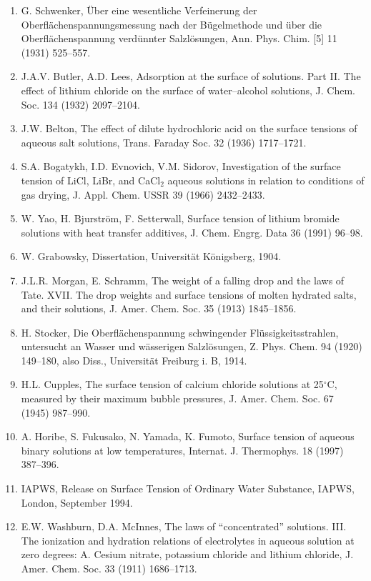 \documentclass[11pt]{article}
\begin{document}
\begin{enumerate}
\item G. Schwenker, \"Uber eine wesentliche Verfeinerung der Oberfl\"achenspannungsmessung nach der B\"ugelmethode und \"uber die Oberfl\"achenspannung verd\"unnter Salzl\"osungen, Ann. Phys. Chim. [5] 11 (1931) 525--557.
\item J.A.V. Butler, A.D. Lees, Adsorption at the surface of solutions. Part II. The effect of lithium chloride on the surface of water--alcohol solutions, J. Chem. Soc. 134 (1932) 2097--2104.
\item J.W. Belton, The effect of dilute hydrochloric acid on the surface tensions of aqueous salt solutions, Trans. Faraday Soc. 32 (1936) 1717--1721.
\item S.A. Bogatykh, I.D. Evnovich, V.M. Sidorov, Investigation of the surface tension of LiCl, LiBr, and CaCl$_2$ aqueous solutions in relation to conditions of gas drying, J. Appl. Chem. USSR 39 (1966) 2432--2433.
\item W. Yao, H. Bjurstr\"om, F. Setterwall, Surface tension of lithium bromide solutions with heat transfer additives, J. Chem. Engrg. Data 36 (1991) 96--98.
\item W. Grabowsky, Dissertation, Universit\"at K\"onigsberg, 1904.
\item J.L.R. Morgan, E. Schramm, The weight of a falling drop and the laws of Tate. XVII. The drop weights and surface tensions of molten hydrated salts, and their solutions, J. Amer. Chem. Soc. 35 (1913) 1845--1856.
\item H. Stocker, Die Oberfl\"achenspannung schwingender Fl\"ussigkeitsstrahlen, untersucht an Wasser und w\"asserigen Salzl\"osungen, Z. Phys. Chem. 94 (1920) 149--180, also Diss., Universit\"at Freiburg i. B, 1914.
\item H.L. Cupples, The surface tension of calcium chloride solutions at 25$^\circ$C, measured by their maximum bubble pressures, J. Amer. Chem. Soc. 67 (1945) 987--990.
\item A. Horibe, S. Fukusako, N. Yamada, K. Fumoto, Surface tension of aqueous binary solutions at low temperatures, Internat. J. Thermophys. 18 (1997) 387--396.
\item IAPWS, Release on Surface Tension of Ordinary Water Substance, IAPWS, London, September 1994.
\item E.W. Washburn, D.A. McInnes, The laws of ``concentrated'' solutions. III. The ionization and hydration relations of electrolytes in aqueous solution at zero degrees: A. Cesium nitrate, potassium chloride and lithium chloride, J. Amer. Chem. Soc. 33 (1911) 1686--1713.

\end{enumerate}
\end{document}
